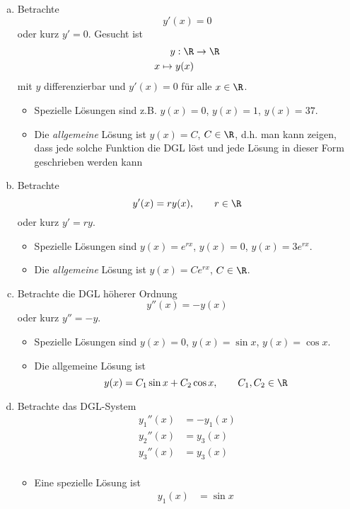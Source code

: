 \documentclass[
]{mycourse}
\begin{document}
\begin{ex} \label{1.1}
	\begin{enumerate}[a)]
		\item
			Betrachte
			\[
				y'(x) = 0
			\]
			oder kurz $y' = 0$.
			Gesucht ist
			\begin{align*}
				y: \R &\to \R \\
				x \mapsto y(x)
			\end{align*}
			mit $y$ differenzierbar und $y'(x) = 0$ für alle $x \in \R$.
			\begin{itemize}
				\item
					Spezielle Lösungen sind z.B. $y(x)=0$, $y(x)=1$, $y(x) = 37$.
				\item
					Die \emph{allgemeine} Lösung ist $y(x) = C$, $C \in \R$, d.h. man kann zeigen, dass jede solche Funktion die DGL löst und jede Lösung in dieser Form geschrieben werden kann
			\end{itemize}
		\item
			Betrachte
			\[
				y'(x) = r y(x),
				\qquad r\in \R
			\]
			oder kurz $y' = ry$.
			\begin{itemize}
				\item
					Spezielle Lösungen sind $y(x)=e^{rx}$, $y(x)=0$, $y(x)=3e^{rx}$.
				\item
					Die \emph{allgemeine} Lösung ist $y(x) = C e^{rx}$, $C\in \R$.
			\end{itemize}
		\item
			Betrachte die DGL höherer Ordnung
			\[
				y''(x) = -y(x)
			\]
			oder kurz $y'' = -y$.
			\begin{itemize}
				\item
					Spezielle Lösungen sind $y(x) = 0$, $y(x) = \sin x$, $y(x)=\cos x$.
				\item
					Die allgemeine Lösung ist
					\[
						y(x) = C_1 \sin x + C_2 \cos x,
						\qquad C_1, C_2 \in \R
					\]
			\end{itemize}
		\item
			Betrachte das DGL-System
			\begin{align*}
				y_1''(x) &= -y_1(x) \\
				y_2''(x) &= y_3(x) \\
				y_3''(x) &= y_3(x) \\
			\end{align*}
			\begin{itemize}
				\item
					Eine spezielle Lösung ist
					\begin{align*}
						y_1(x) &= \sin x \\

\end{align*}
\end{itemize}
\end{enumerate}
\end{ex}
\end{document}
